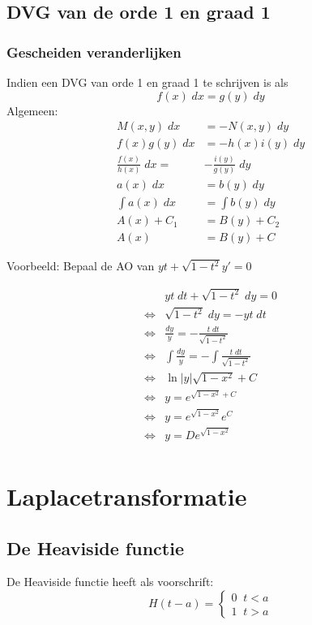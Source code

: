 \documentclass[12pt]{report}
\newcommand{\example}[2]{
    \hrulefill
    
    Voorbeeld: #1
    
    #2
    
    \hrulefill
}
\begin{document}
\section{DVG van de orde 1 en graad 1}
\subsection{Gescheiden veranderlijken}
Indien een DVG van orde 1 en graad 1 te schrijven is als
$$f(x)\;dx = g(y)\;dy$$
Algemeen:
\begin{equation*}
 \begin{split}
  M(x, y)\;dx & = -N(x, y)\; dy \\
  f(x)g(y)\;dx & = -h(x)i(y)\; dy \\
  \frac{f(x)}{h(x)}\; dx = & -\frac{i(y)}{g(y)}\;dy \\
  a(x) \; dx & = b(y)\; dy \\
  \int a(x) \; dx & = \int b(y) \; dy \\
  A(x) + C_1 & = B(y) + C_2 \\
  A(x) & = B(y) + C
 \end{split}
\end{equation*}
\example{
    Bepaal de AO van $yt + \sqrt{1 - t^2}y' = 0$
}{
    \begin{equation*}
     \begin{split}
      & yt\;dt + \sqrt{1 - t^2}\;dy = 0 \\
      \Leftrightarrow & \sqrt{1 - t^2}\;dy = -yt\;dt \\
      \Leftrightarrow & \frac{dy}{y}= -\frac{t\;dt}{\sqrt{1 - t^2}} \\
      \Leftrightarrow & \int \frac{dy}{y}= -\int \frac{t\;dt}{\sqrt{1 - t^2}} \\
      \Leftrightarrow & \ln |y| \sqrt{1 - x^2} + C \\
      \Leftrightarrow & y = e^{\sqrt{1 - x^2} + C} \\
      \Leftrightarrow & y = e^{\sqrt{1 - x^2}}e^C \\
      \Leftrightarrow & y = De^{\sqrt{1 - x^2}} \\
     \end{split}
    \end{equation*}

}


\chapter{Laplacetransformatie}
\section{De Heaviside functie}
De Heaviside functie heeft als voorschrift:
$$H(t - a) = 
\begin{cases}
0 \;\; t < a \\
1 \;\; t > a
\end{cases}$$
\end{document}
